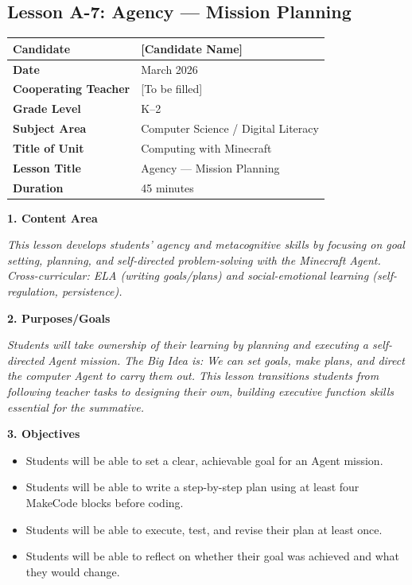 \documentclass[11pt,letterpaper]{article}
\begin{document}
\newpage
\subsection{Lesson A-7: Agency --- Mission Planning}
\label{sub:LessonA7AgencyMissionPlanning}

\begin{longtable}{|L{0.28\textwidth}|L{0.65\textwidth}|}
\hline
\textbf{Candidate}  & [Candidate Name]  \\
\hline
\textbf{Date}  & March 2026  \\
\hline
\textbf{Cooperating Teacher}  & [To be filled]  \\
\hline
\textbf{Grade Level}  & K--2  \\
\hline
\textbf{Subject Area}  & Computer Science / Digital Literacy  \\
\hline
\textbf{Title of Unit}  & Computing with Minecraft  \\
\hline
\textbf{Lesson Title}  & Agency --- Mission Planning  \\
\hline
\textbf{Duration}  & 45 minutes  \\
\hline
\end{longtable}

\textbf{1. Content Area}

\textit{This lesson develops students' agency and metacognitive skills by focusing on goal setting, planning, and self-directed problem-solving with the Minecraft Agent. Cross-curricular: ELA (writing goals/plans) and social-emotional learning (self-regulation, persistence).}

\textbf{2. Purposes/Goals}

\textit{Students will take ownership of their learning by planning and executing a self-directed Agent mission. The Big Idea is: We can set goals, make plans, and direct the computer Agent to carry them out. This lesson transitions students from following teacher tasks to designing their own, building executive function skills essential for the summative.}

\textbf{3. Objectives}

\begin{itemize}
  \item Students will be able to set a clear, achievable goal for an Agent mission.

  \item Students will be able to write a step-by-step plan using at least four MakeCode blocks before coding.

  \item Students will be able to execute, test, and revise their plan at least once.

  \item Students will be able to reflect on whether their goal was achieved and what they would change.
\end{itemize}
\end{document}
